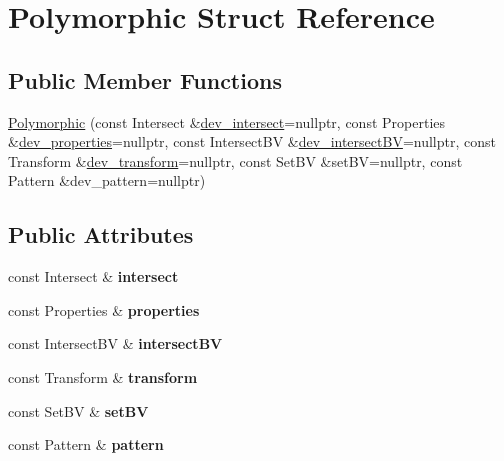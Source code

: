 \hypertarget{struct_polymorphic}{}\section{Polymorphic Struct Reference}
\label{struct_polymorphic}
\subsection*{Public Member Functions}
\begin{DoxyCompactItemize}
\item 
\hyperlink{struct_polymorphic_a8a1a7aa3ea005bcf84bd8110d9b6a9f2}{Polymorphic} (const Intersect \&\hyperlink{group__device__pointers_ga00654ffb007d4b5c95c00b429dc26ae9}{dev\+\_\+intersect}=nullptr, const Properties \&\hyperlink{group__device__pointers_gac0d627981d2453b8f45dc3cca7a69a28}{dev\+\_\+properties}=nullptr, const Intersect\+BV \&\hyperlink{group__device__pointers_gaeee39cf2f67c91f2a6c312651283dc94}{dev\+\_\+intersect\+BV}=nullptr, const Transform \&\hyperlink{group__device__pointers_gac3760d5ca4da6826e005200738140558}{dev\+\_\+transform}=nullptr, const Set\+BV \&set\+BV=nullptr, const Pattern \&dev\+\_\+pattern=nullptr)
\end{DoxyCompactItemize}
\subsection*{Public Attributes}
\begin{DoxyCompactItemize}
\item 
const Intersect \& {\bfseries intersect}\hypertarget{struct_polymorphic_a5f3c42ecfadb152a3658a00c0ecb1873}{}\label{struct_polymorphic_a5f3c42ecfadb152a3658a00c0ecb1873}

\item 
const Properties \& {\bfseries properties}\hypertarget{struct_polymorphic_aee39f2f94f8cbbb7d82a5c89bc879023}{}\label{struct_polymorphic_aee39f2f94f8cbbb7d82a5c89bc879023}

\item 
const Intersect\+BV \& {\bfseries intersect\+BV}\hypertarget{struct_polymorphic_afe3626a4aa28bfc95bfae27e624f86f6}{}\label{struct_polymorphic_afe3626a4aa28bfc95bfae27e624f86f6}

\item 
const Transform \& {\bfseries transform}\hypertarget{struct_polymorphic_ad748762337dae443f098dd531e7781d2}{}\label{struct_polymorphic_ad748762337dae443f098dd531e7781d2}

\item 
const Set\+BV \& {\bfseries set\+BV}\hypertarget{struct_polymorphic_aa71af495247c0c740b66ab32c242505a}{}\label{struct_polymorphic_aa71af495247c0c740b66ab32c242505a}

\item 
const Pattern \& {\bfseries pattern}\hypertarget{struct_polymorphic_a9dc360effd8472a7c174993e6a02dfbf}{}\label{struct_polymorphic_a9dc360effd8472a7c174993e6a02dfbf}

\end{DoxyCompactItemize}


